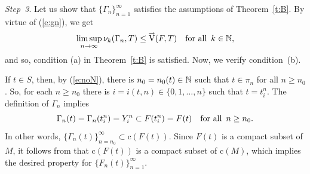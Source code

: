 \documentclass[preprint,12pt]{elsarticle}
\newcommand{\eq}[1]{\mbox{\rm(\ref{#1})}}
\newcommand{\riV}{{\scriptstyle\overrightarrow{\mbox{\rm V}}}}
\begin{document}
\begin{pfBV}
{\it Step~3}. Let us show that $\{\Gamma_n\}_{n=1}^\infty$ satisfies the assumptions
of Theorem~\ref{t:B}. By virtue of \eq{e:gn}, we get
  \begin{equation*}
\limsup_{n\to\infty}\nu_k(\Gamma_n,T)\le\riV(F,T)\quad\mbox{for all \,$k\in\Nb$,}
  \end{equation*}
and so, condition (a) in Theorem~\ref{t:B} is satisfied. Now, we verify condition~(b).

If $t\in S$, then, by \eq{e:noN}, there is $n_0=n_0(t)\in\mathbb{N}$ such that $t\in\pi_n$ for
all $n\ge n_0$. So, for each $n\ge n_0$ there is $i=i(t,n)\in\{0,1,\dots,n\}$ such that
$t=t_i^n$. The definition of $\Gamma_n$ implies
  \begin{equation} \label{e:Gat}
\Gamma_n(t)=\Gamma_n(t_i^n)=Y_i^n\subset F(t_i^n)=F(t)\quad
\mbox{for all \,$n\ge n_0$.}
  \end{equation}
In other words, $\{\Gamma_n(t)\}_{n=n_0}^\infty\subset\mbox{c}(F(t))$. Since
$F(t)$ is a compact subset of $M$, it follows from \cite[II.1.4]{CV} that
$\mbox{c}(F(t))$ is a compact subset of $\mbox{c}(M)$, which implies the desired
property for $\{F_n(t)\}_{n=1}^\infty$.


\end{pfBV}
\end{document}
